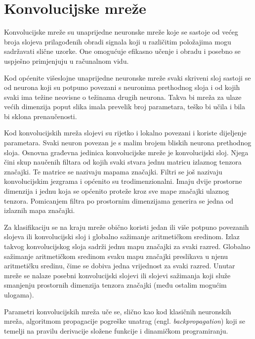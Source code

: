 \documentclass[utf8, diplomski, numeric, lmodern]{fer}
\begin{document}
\chapter{Konvolucijske mreže} \label{chap:konv-nn}
Konvolucijske mreže su unaprijedne neuronske mreže koje se sastoje od većeg broja slojeva prilagođenih obradi signala koji u različitim položajima mogu sadržavati slične uzorke. One omogućuje efikasno učenje i obradu i posebno se uspješno primjenjuju u računalnom vidu.

Kod općenite višeslojne unaprijedne neuronske mreže svaki skriveni sloj sastoji se od neurona koji su potpuno povezani s neuronima prethodnog sloja i od kojih svaki ima težine neovisne o težinama drugih neurona. Takva bi mreža za ulaze većih dimenzija poput slika imala prevelik broj parametara, teško bi učila i bila bi sklona prenaučenosti. 

Kod konvolucijskih mreža slojevi su rijetko i lokalno povezani i koriste dijeljenje parametara. Svaki neuron povezan je s malim brojem bliskih neurona prethodnog sloja. Osnovna građevna jedinica konvolucijske mreže je konvolucijski sloj. Njega čini skup naučenih filtara od kojih svaki stvara jednu matricu izlaznog tenzora značajki. Te matrice se nazivaju mapama značajki. Filtri se još nazivaju konvolucijskim jezgrama i općenito su trodimenzionalni. Imaju dvije prostorne dimenzija i jednu koja se općenito proteže kroz sve mape značajki ulaznog tenzora. Pomicanjem filtra po prostornim dimenzijama generira se jedna od izlaznih mapa značajki.

Za klasifikaciju se na kraju mreže obično koristi jedan ili više potpuno povezanih slojeva ili konvolucijski sloj i globalno sažimanje aritmetičkom sredinom. Izlaz takvog konvolucijskog sloja sadrži jednu mapu značajki za svaki razred. Globalno sažimanje aritmetičkom sredinom svaku mapu značajki preslikava u njenu aritmetičku sredinu, čime se dobiva jedna vrijednost za svaki razred. Unutar mreže se nalaze posebni konvolucijski slojevi ili slojevi sažimanja koji služe smanjenju prostornih dimenzija tenzora značajki (među ostalim mogućim ulogama).

Parametri konvolucijskih mreža uče se, slično kao kod klasičnih neuronskih mreža, algoritmom propagacije pogreške unatrag (engl. \emph{backpropagation}) koji se temelji na pravilu derivacije složene funkcije i dinamičkom programiranju.
\end{document}
